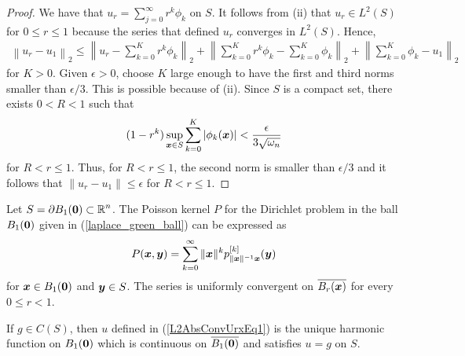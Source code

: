 \begin{proof}
 We have that $\displaystyle u_r = \sum_{j=0}^\infty r^k\phi_k$
on $S$.  It follows from (ii) that $\displaystyle u_r \in L^2(S)$ for
$0\leq r \leq 1$ because the series that defined $u_r$ converges in
$\displaystyle L^2(S)$.  Hence,
\begin{align*}
\left\| u_r- u_1 \right\|_2
\leq \left\| u_r - \sum_{k=0}^K r^k \phi_k \right\|_2
+ \left\| \sum_{k=0}^K r^k \phi_k - \sum_{k=0}^K \phi_k \right\|_2
+ \left\| \sum_{k=0}^K \phi_k - u_1 \right\|_2
\end{align*}
for $K>0$.
Given $\epsilon >0$, choose $K$ large enough to have the first and
third norms smaller than $\epsilon/3$.  This is possible because of (ii).
Since $S$ is a compact set, there exists $0<R<1$ such that
\[
  (1-r^k) \sup_{{\bm{x}} \in S} \sum_{k=0}^K \left|\phi_k({\bm{x}}) \right|
< \frac{\epsilon}{3 \sqrt{\omega_n}}
\]
for $R <r \leq 1$.  Thus, for $R < r \leq 1$, the second norm is
smaller than $\epsilon/3$ and it follows that
$\| u_r - u_1\| \leq \epsilon$ for $R < r \leq 1$.
\end{proof}

\begin{cor} \label{L2AbsConvUrxCor}
Let $\displaystyle S = \partial B_1({\bm{0}}) \subset \mathbb{R}^n$.
The Poisson kernel $P$ for the Dirichlet problem in the ball
$B_1({\bm{0}})$ given in (\ref{laplace_green_ball}) can be expressed as
\[
  P({\bm{x}},{\bm{y}}) = \sum_{k=0}^\infty \|{\bm{x}}\|^k
p_{\|{\bm{x}}\|^{-1}{\bm{x}}}^{[k]}({\bm{y}})
\]
for ${\bm{x}} \in B_1({\bm{0}})$ and ${\bm{y}} \in S$.  The series
is uniformly convergent on $\overline{B_r({\bm{x}})}$ for every
$0 \leq r<1$.

If $g\in C(S)$, then $u$ defined in (\ref{L2AbsConvUrxEq1}) is
the unique harmonic function on $B_1({\bm{0}})$ which is continuous on
$\overline{B_1({\bm{0}})}$ and satisfies $u = g$ on $S$.
\end{cor}

